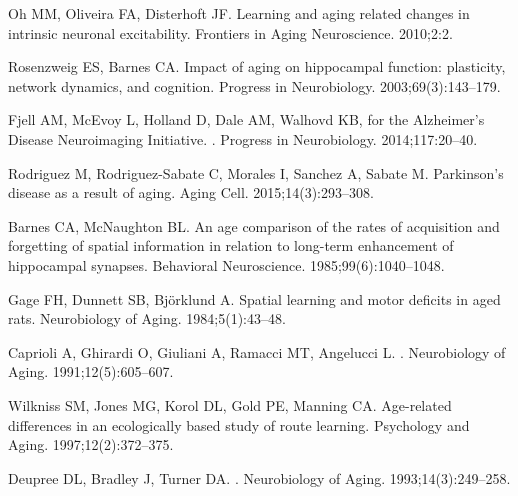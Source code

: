 \documentclass[10pt,letterpaper]{article}
\begin{document}

%

\begin{thebibliography}{100}

Oh MM, Oliveira FA, Disterhoft JF.
\newblock Learning and aging related changes in intrinsic neuronal excitability.
\newblock Frontiers in Aging Neuroscience. 2010;2:2.

Rosenzweig ES, Barnes CA.
\newblock Impact of aging on hippocampal function: plasticity, network dynamics, and cognition.
\newblock Progress in Neurobiology. 2003;69(3):143--179.

Fjell AM, McEvoy L, Holland D, Dale AM, Walhovd KB, {for the Alzheimer's Disease Neuroimaging Initiative}.
.
\newblock Progress in Neurobiology. 2014;117:20--40.

Rodriguez M, Rodriguez-Sabate C, Morales I, Sanchez A, Sabate M.
\newblock Parkinson's disease as a result of aging.
\newblock Aging Cell. 2015;14(3):293--308.

Barnes CA, McNaughton BL.
\newblock An age comparison of the rates of acquisition and forgetting of spatial information in relation to long-term enhancement of hippocampal synapses.
\newblock Behavioral Neuroscience. 1985;99(6):1040--1048.

Gage FH, Dunnett SB, Bj{\"o}rklund A.
\newblock Spatial learning and motor deficits in aged rats.
\newblock Neurobiology of Aging. 1984;5(1):43--48.

Caprioli A, Ghirardi O, Giuliani A, Ramacci MT, Angelucci L.
.
\newblock Neurobiology of Aging. 1991;12(5):605--607.

Wilkniss SM, Jones MG, Korol DL, Gold PE, Manning CA.
\newblock Age-related differences in an ecologically based study of route learning.
\newblock Psychology and Aging. 1997;12(2):372--375.

Deupree DL, Bradley J, Turner DA.
.
\newblock Neurobiology of Aging. 1993;14(3):249--258.


\end{thebibliography}
\end{document}

